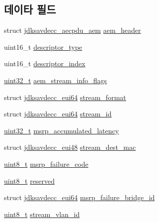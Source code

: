 \subsection*{데이타 필드}
\begin{DoxyCompactItemize}
\item 
struct \hyperlink{structjdksavdecc__aecpdu__aem}{jdksavdecc\+\_\+aecpdu\+\_\+aem} \hyperlink{structjdksavdecc__aem__command__set__stream__info__response_ae1e77ccb75ff5021ad923221eab38294}{aem\+\_\+header}
\item 
uint16\+\_\+t \hyperlink{structjdksavdecc__aem__command__set__stream__info__response_ab7c32b6c7131c13d4ea3b7ee2f09b78d}{descriptor\+\_\+type}
\item 
uint16\+\_\+t \hyperlink{structjdksavdecc__aem__command__set__stream__info__response_a042bbc76d835b82d27c1932431ee38d4}{descriptor\+\_\+index}
\item 
\hyperlink{parse_8c_a6eb1e68cc391dd753bc8ce896dbb8315}{uint32\+\_\+t} \hyperlink{structjdksavdecc__aem__command__set__stream__info__response_a01e6193642f6392292ade676656c9118}{aem\+\_\+stream\+\_\+info\+\_\+flags}
\item 
struct \hyperlink{structjdksavdecc__eui64}{jdksavdecc\+\_\+eui64} \hyperlink{structjdksavdecc__aem__command__set__stream__info__response_a77359be54ea386b1da66597746709ed0}{stream\+\_\+format}
\item 
struct \hyperlink{structjdksavdecc__eui64}{jdksavdecc\+\_\+eui64} \hyperlink{structjdksavdecc__aem__command__set__stream__info__response_af4c017686a11885d1d514c21bcde8160}{stream\+\_\+id}
\item 
\hyperlink{parse_8c_a6eb1e68cc391dd753bc8ce896dbb8315}{uint32\+\_\+t} \hyperlink{structjdksavdecc__aem__command__set__stream__info__response_a58ec17b43515ffd62f6380695f8f59b2}{msrp\+\_\+accumulated\+\_\+latency}
\item 
struct \hyperlink{structjdksavdecc__eui48}{jdksavdecc\+\_\+eui48} \hyperlink{structjdksavdecc__aem__command__set__stream__info__response_acb9f6beb748e2b0e9086f809a4b3143d}{stream\+\_\+dest\+\_\+mac}
\item 
\hyperlink{stdint_8h_aba7bc1797add20fe3efdf37ced1182c5}{uint8\+\_\+t} \hyperlink{structjdksavdecc__aem__command__set__stream__info__response_ad3d0b0a294bb35f39b361259730159d7}{msrp\+\_\+failure\+\_\+code}
\item 
\hyperlink{stdint_8h_aba7bc1797add20fe3efdf37ced1182c5}{uint8\+\_\+t} \hyperlink{structjdksavdecc__aem__command__set__stream__info__response_acb7bc06bed6f6408d719334fc41698c7}{reserved}
\item 
struct \hyperlink{structjdksavdecc__eui64}{jdksavdecc\+\_\+eui64} \hyperlink{structjdksavdecc__aem__command__set__stream__info__response_ad53a697054b76cf96ebb0d69a8cf8fb8}{msrp\+\_\+failure\+\_\+bridge\+\_\+id}
\item 
\hyperlink{stdint_8h_aba7bc1797add20fe3efdf37ced1182c5}{uint8\+\_\+t} \hyperlink{structjdksavdecc__aem__command__set__stream__info__response_a6ad38338505a58fc768e6fb6caf18a22}{stream\+\_\+vlan\+\_\+id}
\end{DoxyCompactItemize}


